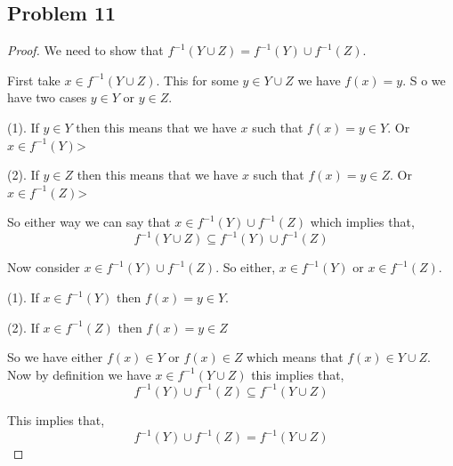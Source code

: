 \documentclass[a4paper]{report}
\begin{document}
\subsection*{Problem 11}
\begin{proof}
    We need to show that $f^{-1}(Y \cup Z) = f^{-1}(Y) \cup f^{-1}(Z)$.

    First take $x \in f^{-1}(Y \cup Z)$. This for some $y \in Y \cup Z$ we have  $f(x) = y$. S o we have two cases  $y \in Y$ or $y \in Z$. 

    (1). If $y \in Y$ then this means that we have $x$ such that $f(x) = y \in Y$. Or $x \in f^{-1}(Y)$>

    (2). If $y \in Z$ then this means that we have $x$ such that $f(x) = y \in Z$. Or $x \in f^{-1}(Z)$>

    So either way we can say that $x \in f^{-1}(Y) \cup f^{-1}(Z)$ which implies that, 
    $$ f^{-1}(Y \cup Z) \subseteq f^{-1}(Y) \cup f^{-1}(Z) $$ 

    Now consider $x \in f^{-1}(Y) \cup f^{-1}(Z)$. So either, $x \in f^{-1}(Y)$ or $x \in f^{-1}(Z)$. 

    (1). If $x \in f^{-1}(Y)$ then $f(x) = y \in Y$. 

    (2). If $x \in f^{-1}(Z)$  then $f(x) = y \in Z$

    So we have either $f(x) \in Y$ or $f(x) \in Z$ which means that $f(x) \in Y \cup Z$. Now by definition we have $x \in f^{-1}(Y \cup Z)$ this implies that, 
    $$  f^{-1}(Y) \cup f^{-1}(Z)\subseteq  f^{-1}(Y \cup Z) $$ 

    This implies that, 
    $$  f^{-1}(Y) \cup f^{-1}(Z) =   f^{-1}(Y \cup Z) $$ 

\end{proof}
\end{document}

